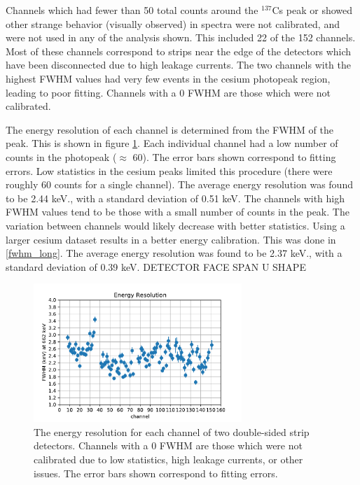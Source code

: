 Channels which had fewer than 50 total counts around the ${}^{137}$Cs peak or showed other strange behavior (visually observed) in spectra were not calibrated, and were not used in any of the analysis shown. This included 22 of the 152 channels. Most of these channels correspond to strips near the edge of the detectors which have been disconnected due to high leakage currents. The two channels with the highest FWHM values had very few events in the cesium photopeak region, leading to poor fitting. Channels with a 0 FWHM are those which were not calibrated.

The energy resolution of each channel is determined from the FWHM of the peak. This is shown in figure \ref{fwhm}. Each individual channel had a low number of counts in the photopeak ($\approx$ 60). The error bars shown correspond to fitting errors. Low statistics in the cesium peaks limited this procedure (there were roughly 60 counts for a single channel). The average energy resolution was found to be 2.44 keV., with a standard deviation of 0.51 keV. The channels with high FWHM values tend to be those with a small number of counts in the peak. The variation between channels would likely decrease with better statistics.  Using a larger cesium dataset results in a better energy calibration. This was done in \ref{fwhm_long}. The average energy resolution was found to be 2.37 keV., with a standard deviation of 0.39 keV. DETECTOR FACE SPAN U SHAPE

\begin{figure}[h]
\begin{centering}
\includegraphics[width=0.7\textwidth]{./figures/energy_res.pdf}
\caption{The energy resolution for each channel of two double-sided strip detectors. Channels with a 0 FWHM are those which were not calibrated due to low statistics, high leakage currents, or other issues. The error bars shown correspond to fitting errors.}
\label{fwhm}
\end{centering}
\end{figure}

